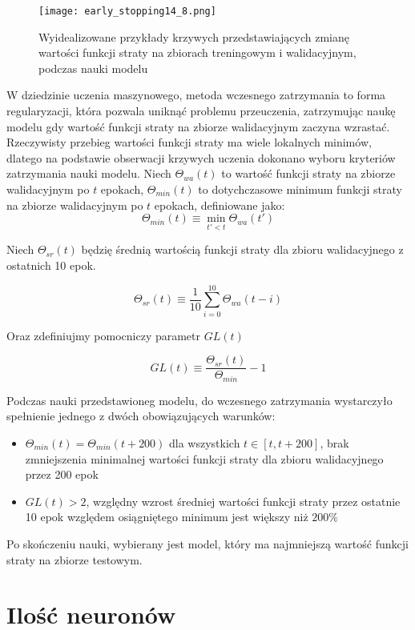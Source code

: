 \documentclass[11pt]{book}
\theoremstyle{definition}
\begin{document}
\begin{figure}[htp!]
	\centering
	\texttt{[image: early\_stopping14\_8.png]}
	\caption{Wyidealizowane przykłady krzywych przedstawiających zmianę wartości funkcji straty na zbiorach treningowym i walidacyjnym, podczas nauki modelu}
	\label{fig:loss_curves}
\end{figure}

W dziedzinie uczenia maszynowego, metoda wczesnego zatrzymania to forma regularyzacji, która pozwala uniknąć problemu przeuczenia, zatrzymując naukę modelu gdy wartość funkcji straty na zbiorze walidacyjnym zaczyna wzrastać. Rzeczywisty przebieg wartości funkcji straty ma wiele lokalnych minimów, dlatego na podstawie obserwacji krzywych uczenia dokonano wyboru kryteriów zatrzymania nauki modelu. 
Niech $\Theta_{wa}(t)$ to wartość funkcji straty na zbiorze walidacyjnym po $t$ epokach, $\Theta_{min}(t)$ to dotychczasowe minimum funkcji straty na zbiorze walidacyjnym po $t$ epokach, definiowane jako:
$$
\Theta_{min}(t) \equiv \min_{t' < t} \Theta_{wa}(t')
$$

Niech $\Theta_{sr}(t)$ będzię średnią wartością funkcji straty dla zbioru walidacyjnego z ostatnich 10 epok.

$$
\Theta_{sr}(t) \equiv \frac{1}{10} \sum_{i=0}^{10} \Theta_{wa}(t-i)
$$

Oraz zdefiniujmy pomocniczy parametr $GL(t)$


$$
GL(t) \equiv \frac{\Theta_{sr}(t)}{\Theta_{min}} - 1
$$


Podczas nauki przedstawioneg modelu, do wczesnego zatrzymania wystarczyło spełnienie jednego z dwóch obowiązujących warunków:

\begin{itemize}
	\item $\Theta_{min}(t) = \Theta_{min}(t+ 200)$ dla wszystkich $t \in [t,t+200]$, brak zmniejszenia minimalnej wartości funkcji straty dla zbioru walidacyjnego przez 200 epok 
	\item $ GL(t)  > 2$, względny wzrost średniej wartości funkcji straty przez ostatnie 10 epok względem osiągniętego minimum jest większy niż $200\%$
\end{itemize}

Po skończeniu nauki, wybierany jest model, który ma najmniejszą wartość funkcji straty na zbiorze testowym.

\section{Ilość neuronów}
\end{document}
